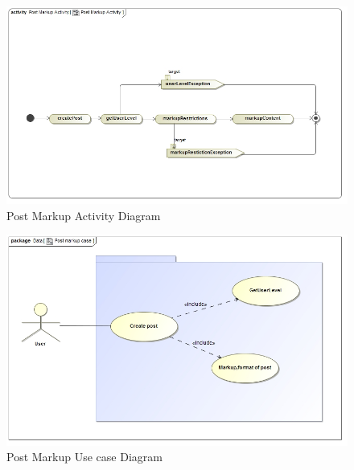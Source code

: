 \documentclass[11pt]{article}
\begin{document}
\begin{enumerate}
\graphicspath{ {../Diagrams/Matt/Activity/} }
	  \begin{figure}[H]	
    	\includegraphics[scale=0.5]{PostMarkupActivity.jpg}
    	\caption{Post Markup Activity Diagram}
	\end{figure}
	
\graphicspath{ {../Diagrams/Matt/Case/} }
	  \begin{figure}[H]	
    	\includegraphics[scale=0.5]{Postmarkupcase.jpg}
    	\caption{Post Markup Use case Diagram}
	\end{figure}


\end{enumerate}
\end{document}
